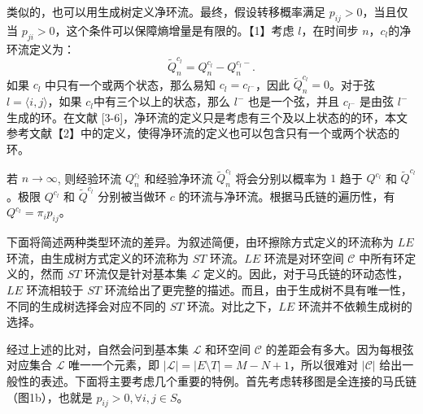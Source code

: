 类似的，也可以用生成树定义净环流。最终，假设转移概率满足 $p_{ij}>0$，当且仅当 $p_{ji}>0$，这个条件可以保障熵增量是有限的。【1】考虑 $l
$，在时间步 $n$，$c_l$的净环流定义为：
\begin{equation*}
    \tilde{Q}^{c_l}_n=Q^{c_l}_n-Q^{c_l-}_n.
\end{equation*}
如果 $c_l$ 中只有一个或两个状态，那么易知 $c_l = c_{l^-}$，因此 $\tilde{Q}_n^{c_l}=0$。对于弦 $l=\langle i,j \rangle$，如果 $c_l$中有三个以上的状态，那么 $l^-$ 也是一个弦，并且 $c_{l^-}$ 是由弦 $l^-$ 生成的环。在文献 [3-6]，净环流的定义只是考虑有三个及以上状态的的环，本文参考文献【2】中的定义，使得净环流的定义也可以包含只有一个或两个状态的环。

若 $n \to \infty$, 则经验环流 $Q_n^{c_l}$ 和经验净环流 $\tilde{Q}_n^{c_l}$ 将会分别以概率为 $1$ 趋于 $Q^{c_l}$ 和 $\tilde{Q}^{c_l}$。极限 $Q^{c_l}$ 和 $\tilde{Q}^{c_l}$ 分别被当做环 $c$ 的环流与净环流。根据马氏链的遍历性，有 $Q^{c_l} = \pi_i p_{ij}$。

下面将简述两种类型环流的差异。为叙述简便，由环擦除方式定义的环流称为 $LE$ 环流，由生成树方式定义的环流称为 $ST$ 环流。$LE$ 环流是对环空间 $\mathcal{C}$ 中所有环定义的，然而 $ST$ 环流仅是针对基本集 $\mathcal{L}$ 定义的。因此，对于马氏链的环动态性，$LE$ 环流相较于 $ST$ 环流给出了更完整的描述。而且，由于生成树不具有唯一性，不同的生成树选择会对应不同的 $ST$ 环流。对比之下，$LE$ 环流并不依赖生成树的选择。

经过上述的比对，自然会问到基本集 $\mathcal{L}$ 和环空间 $\mathcal{C}$ 的差距会有多大。因为每根弦对应集合 $\mathcal{L}$ 唯一一个元素，即 $|\mathcal{L}| = |E\setminus T| = M-N+1$，所以很难对 $|\mathcal{C}|$ 给出一般性的表述。下面将主要考虑几个重要的特例。首先考虑转移图是全连接的马氏链（图1b），也就是 $p_{ij}>0, \forall i,j \in S$。